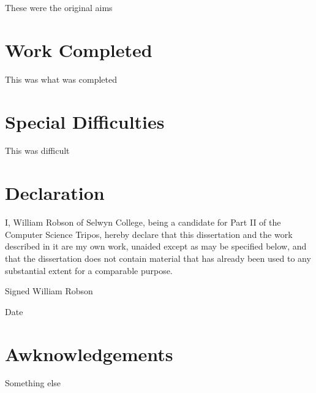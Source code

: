 These were the original aims

\section*{Work Completed}

This was what was completed

\section*{Special Difficulties}

This was difficult

\pagebreak

\section*{Declaration}

I, William Robson of Selwyn College, being a candidate for Part II of the Computer Science Tripos,
hereby declare that this dissertation and the work described in it are my own work, unaided except
as may be specified below, and that the dissertation does not contain material that has already
been used to any substantial extent for a comparable purpose.

Signed William Robson

Date \thedate

\cleardoublepage

\tableofcontents
\listoffigures

\newpage

\section*{Awknowledgements}

Something else

\cleardoublepage
\setcounter{page}{1}
\pagestyle{headings}